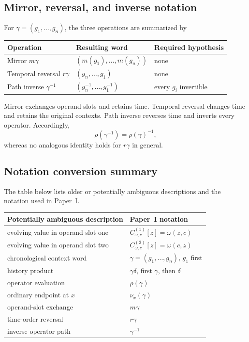 \subsection{Mirror, reversal, and inverse notation}

For $\gamma=(g_1,\ldots,g_n)$, the three operations are summarized by
\begin{center}
\begin{tabular}{lll}
\toprule
Operation & Resulting word & Required hypothesis \\
\midrule
Mirror $m\gamma$
& $(m(g_1),\ldots,m(g_n))$
& none \\
Temporal reversal $r\gamma$
& $(g_n,\ldots,g_1)$
& none \\
Path inverse $\gamma^{-1}$
& $(g_n^{-1},\ldots,g_1^{-1})$
& every $g_i$ invertible \\
\bottomrule
\end{tabular}
\end{center}
Mirror exchanges operand slots and retains time.  Temporal reversal changes
time and retains the original contexts.  Path inverse reverses time and
inverts every operator.  Accordingly,
\[
  \rho(\gamma^{-1})=\rho(\gamma)^{-1},
\]
whereas no analogous identity holds for $r\gamma$ in general.

\subsection{Notation conversion summary}

The table below lists older or potentially ambiguous descriptions and the
notation used in Paper~I.

\begin{center}
\renewcommand{\arraystretch}{1.25}
\begin{tabular}{ll}
\toprule
Potentially ambiguous description & Paper~I notation \\
\midrule
evolving value in operand slot one
& $C_{\omega,c}^{(1)}[z]=\omega(z,c)$ \\
evolving value in operand slot two
& $C_{\omega,c}^{(2)}[z]=\omega(c,z)$ \\
chronological context word
& $\gamma=(g_1,\ldots,g_n)$, $g_1$ first \\
history product
& $\gamma\delta$, first $\gamma$, then $\delta$ \\
operator evaluation
& $\rho(\gamma)$ \\
ordinary endpoint at $x$
& $\nu_x(\gamma)$ \\
operand-slot exchange
& $m\gamma$ \\
time-order reversal
& $r\gamma$ \\
inverse operator path
& $\gamma^{-1}$ \\
\bottomrule
\end{tabular}
\end{center}
